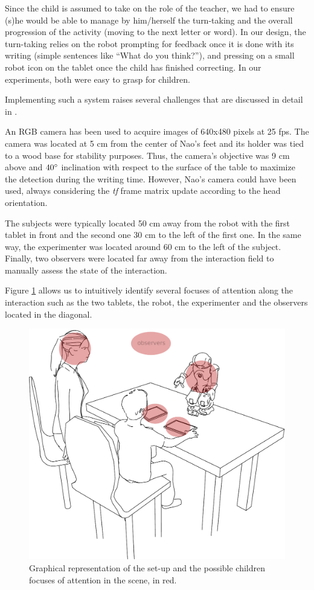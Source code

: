 \documentclass{sig-alternate}
\begin{document}
Since the child is assumed to take on the role of the teacher, we had to ensure
(s)he would be able to manage by him/herself the turn-taking and the overall
progression of the activity (moving to the next letter or word). In our design,
the turn-taking relies on the robot prompting for feedback once it is done with
its writing (simple sentences like ``What do you think?''), and pressing on a
small robot icon on the tablet once the child has finished correcting. In our
experiments, both were easy to grasp for children.

Implementing such a system raises several challenges that are discussed in
detail in \cite{Hood:2015}.

An RGB camera has been used to acquire images of 640x480 pixels at 25 fps. The
camera was located at 5 cm from the center of Nao's feet and its holder was tied
to a wood base for stability purposes. Thus, the camera's objective was 9 cm
above and $ 40\degree $ inclination with respect to the surface of the table to
maximize the detection during the writing time. However, Nao's camera could have
been used, always considering the \textit{tf} frame matrix update according to
the head orientation.

The subjects were typically located 50 cm away from the robot with the first
tablet in front and the second one 30 cm to the left of the first one. In the
same way, the experimenter was located around 60 cm to the left of the subject.
Finally, two observers were located far away from the interaction field to
manually assess the state of the interaction.

Figure \ref{drawSetup} allows us to intuitively identify several focuses of
attention along the interaction such as the two tablets, the robot, the
experimenter and the observers located in the diagonal.

\begin{figure}[h!]
    \centering
    \includegraphics[width=0.7\columnwidth]{drawSetup}
    \caption{\small Graphical representation of the set-up and the possible children focuses of attention in the scene, in red.}
    \label{drawSetup}
\end{figure}
\end{document}

